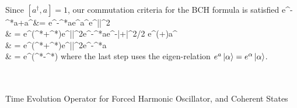 \documentclass[10pt,letterpaper]{article}
\begin{document}
	\\
	Since $[a^\dag,a] = 1$, our commutation criteria for the BCH formula is satisfied
	\ba
		e^{-\gamma^*a+\gamma a^\dag}\ket\alpha &= e^{-\gamma^*a}e^{\gamma a^\dag}e^{|\gamma|^2}
		 \\
		& = e^{(\alpha\gamma^*+\alpha^*\gamma)}e^{|\gamma|^2}e^{-\gamma^*a}e^{-|\alpha+\gamma|^2/2}
		e^{(\alpha+\gamma)a^\dag} \\
		& = e^{(\alpha\gamma^*+\alpha^*\gamma)}e^{|\gamma|^2}e^{-\gamma^*a}\ket{\alpha+\gamma}\\
		& = e^{(\alpha^*\gamma-\gamma^*\alpha)}\ket{\alpha+\gamma}
	\ea
	where the last step uses the eigen-relation $e^a\ket\alpha = e^\alpha\ket\alpha$. 
	\\
	\\
	\\
	\eenum
	
	\item
	Time Evolution Operator for Forced Harmonic Oscillator, and Coherent States
	\\
	\benum
	
\end{document}
